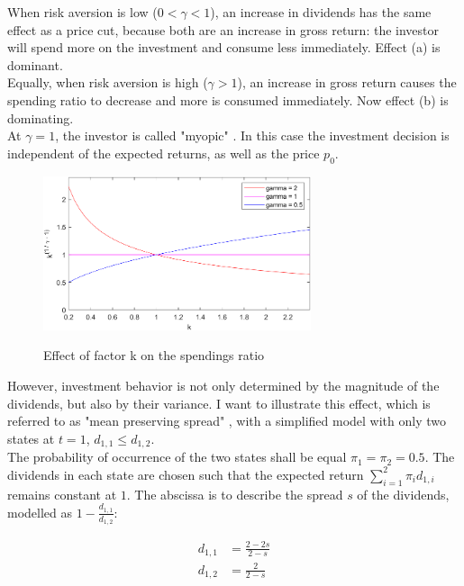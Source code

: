 \bigskip

\noindent When risk aversion is low ($0<\gamma<1$), an increase in dividends has the same effect as a price cut, because both are an increase in gross return: the investor will spend more on the investment and consume less immediately. Effect (a) is dominant.\\

\noindent Equally, when risk aversion is high ($\gamma>1$), an increase in gross return causes the spending ratio to decrease and more is consumed immediately. Now effect (b) is dominating.\\

\noindent At $\gamma = 1$, the investor is called "myopic" \citep{dangl2021notes}. In this case the investment decision is independent of the expected returns, as well as the price $p_0$.

\bigskip

\begin{figure}[h!]
    \centering
    \includegraphics[width=0.7\textwidth]{files/matlab - spending_ratio-k-graph.png}\label{fig:k-spend_ratio}
    \caption{Effect of factor k on the spendings ratio}
\end{figure}

\bigskip

\noindent However, investment behavior is not only determined by the magnitude of the dividends, but also by their variance. I want to illustrate this effect, which is referred to as "mean preserving spread" \citep{rothschild1970mps}, with a simplified model with only two states at $t=1$, $d_{1,1} \leq d_{1,2}$.\\
The probability of occurrence of the two states shall be equal $\pi_1 = \pi_2 = 0.5$. The dividends in each state are chosen such that the expected return $\sum_{i=1}^{2} \pi_i d_{1,i}$ remains constant at $1$. The abscissa is to describe the spread $s$ of the dividends, modelled as $1-\frac{d_{1,1}}{d_{1,2}}$:

\begin{equation*}
\begin{split}
    d_{1,1} &= \frac{2-2s}{2-s}\\
    d_{1,2} &= \frac{2}{2-s}
\end{split}
\end{equation*}

